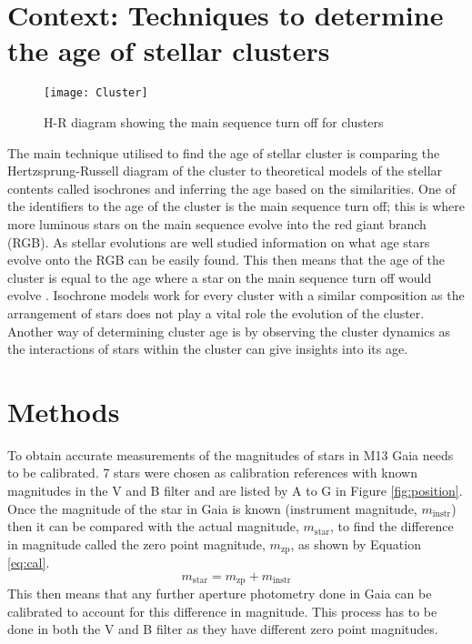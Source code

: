 \documentclass[10pt]{article}
\begin{document}
\section{Context: Techniques to determine the age of stellar clusters}

\begin{wrapfigure}{r}{0.47\textwidth}
	\vspace{-1.1\intextsep}
	\centering
	\texttt{[image: Cluster]}
	\caption{H-R diagram showing the main sequence turn off for clusters}
	\label{fig:mainseq}
\end{wrapfigure}

The main technique utilised to find the age of stellar cluster is comparing the Hertzsprung-Russell diagram of the cluster to theoretical models of the stellar contents called isochrones and inferring the age based on the similarities. One of the identifiers to the age of the cluster is the main sequence turn off; this is where more luminous stars on the main sequence  evolve into the red giant branch (RGB). As stellar evolutions are well studied information on what age stars evolve onto the RGB can be easily found. This then means that the age of the cluster is equal to the age where a star on the main sequence turn off would evolve \citep{lick}. Isochrone models work for every cluster with a similar composition as the arrangement of stars does not play a vital role the evolution of the cluster. Another way of determining cluster age is by observing the cluster dynamics as the interactions of stars within the cluster can give insights into its age. 

\section{Methods}

To obtain accurate measurements of the magnitudes of stars in M13 Gaia needs to be calibrated. 7 stars were chosen as calibration references with known magnitudes in the V and B filter and are listed by A to G in Figure \ref{fig:position}. Once the magnitude of the star in Gaia is known (instrument magnitude, $m_{\text{instr}}$) then it can be compared with the actual magnitude, $m_{\text{star}}$, to find the difference in magnitude called the zero point magnitude, $m_{\text{zp}}$, as shown by Equation \ref{eq:cal}.
\begin{equation}
	m_{\text{star}} = m_{\text{zp}} + m_{\text{instr}}
	\label{eq:cal}
\end{equation}
This then means that any further aperture photometry done in Gaia can be calibrated to account for this difference in magnitude. This process has to be done in both the V and B filter as they have different zero point magnitudes.
\end{document}
